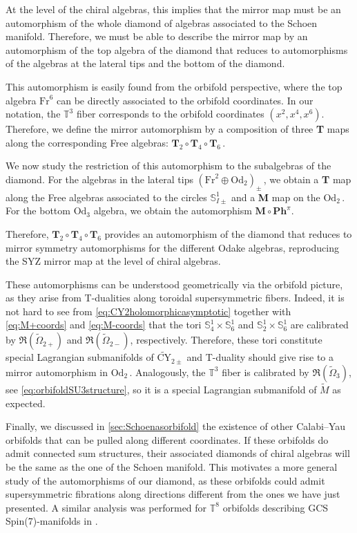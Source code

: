 \documentclass{pspum-l}
\newcommand*\Sc{\mathbb{S}}
\theoremstyle{definition}
\theoremstyle{remark}
\numberwithin{equation}{section}
\begin{document}
At the level of the chiral algebras, this implies that the mirror map must be an automorphism of the whole diamond of algebras associated to the Schoen manifold. Therefore, we must be able to describe the mirror map by an automorphism of the top algebra of the diamond that reduces to automorphisms of the algebras at the lateral tips and the bottom of the diamond.

This automorphism is easily found from the orbifold perspective, where the top algebra $\text{Fr}^6$ can be directly associated to the orbifold coordinates. In our notation, the $\mathbb{T}^3$ fiber corresponds to the orbifold coordinates $(x^2,x^4,x^6)$. Therefore, we define the mirror automorphism by a composition of three \textbf{T} maps along the corresponding Free algebras: $\textbf{T}_2\circ\textbf{T}_4\circ\textbf{T}_6\,$.

We now study the restriction of this automorphism to the subalgebras of the diamond. For the algebras in the lateral tips $\left( \text{Fr}^2\oplus \text{Od}_2 \right)_\pm\,$, we obtain a \textbf{T} map along the Free algebras associated to the circles $\Sc^1_{I\pm}$ and a \textbf{M} map on the $\text{Od}_2\,$. For the bottom $\text{Od}_3$ algebra, we obtain the automorphism $\textbf{M}\circ \textbf{Ph}^\pi$.

Therefore, $\textbf{T}_2\circ\textbf{T}_4\circ\textbf{T}_6$ provides an automorphism of the diamond that reduces to mirror symmetry automorphisms for the different Odake algebras, reproducing the SYZ mirror map at the level of chiral algebras.

These automorphisms can be understood geometrically via the orbifold picture, as they arise from T-dualities along toroidal supersymmetric fibers. Indeed, it is not hard to see from \eqref{eq:CY2holomorphicasymptotic} together with \eqref{eq:M+coords} and \eqref{eq:M-coords} that the tori $\Sc^1_4\times\Sc^1_6$ and $\Sc^1_2\times\Sc^1_6$ are calibrated by $\Re( \widetilde{\Omega}_{2+})$ and $\Re( \widetilde{\Omega}_{2-})$, respectively. Therefore, these tori constitute special Lagrangian submanifolds of $\widetilde{\text{CY}}_{2\pm}$ \cite{Joyce:2007} and T-duality should give rise to a mirror automorphism in $\text{Od}_2\,$. Analogously, the $\mathbb{T}^3$ fiber is calibrated by $\Re(\widetilde{\Omega}_3)$, see \eqref{eq:orbifoldSU3structure}, so it is a special Lagrangian submanifold of $\widetilde{M}$ as expected.

Finally, we discussed in \cref{sec:Schoenasorbifold} the existence of other Calabi--Yau orbifolds that can be pulled along different coordinates. If these orbifolds do admit connected sum structures, their associated diamonds of chiral algebras will be the same as the one of the Schoen manifold. This motivates a more general study of the automorphisms of our diamond, as these orbifolds could admit supersymmetric fibrations along directions different from the ones we have just presented. A similar analysis was performed for $\mathbb{T}^8$ orbifolds describing GCS Spin(7)-manifolds in \cite{Fiset:2021ruv}.
\end{document}
